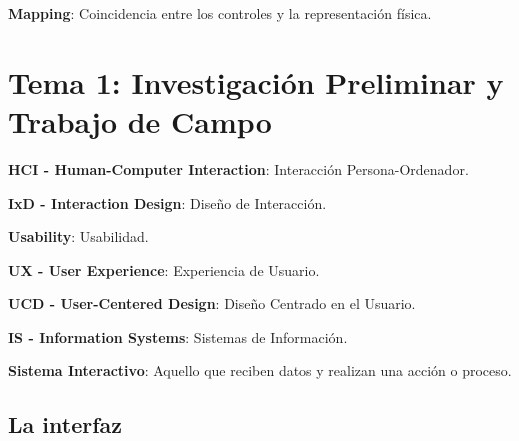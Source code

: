 \documentclass[12pt, twoside, openright]{report} %
\begin{document}
\begin{itemize}
\begin{figure}[H]
{}
	      \end{figure}
\end{itemize}

\textbf{Mapping}: Coincidencia entre los controles y la representación
física.

\chapter{Tema 1: Investigación Preliminar y Trabajo de Campo}

\textbf{HCI - Human-Computer Interaction}: Interacción
Persona-Ordenador.

\textbf{IxD - Interaction Design}: Diseño de Interacción.

\textbf{Usability}: Usabilidad.

\textbf{UX - User Experience}: Experiencia de Usuario.

\textbf{UCD - User-Centered Design}: Diseño Centrado en el Usuario.

\textbf{IS - Information Systems}: Sistemas de Información.

\textbf{Sistema Interactivo}: Aquello que reciben datos y realizan una
acción o proceso.

\section{La interfaz}
\end{document}
